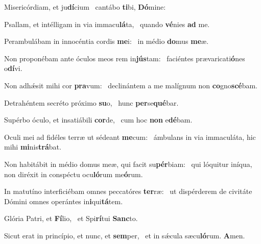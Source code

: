 \item Misericórdiam, et ju\textbf{dí}cium~\psstar{} cantábo \textbf{ti}bi, \textbf{Dó}mine:

\item Psallam, et intélligam in via immacu\textbf{lá}ta,~\psstar{} quando \textbf{vé}nies \textbf{ad} me.

\item Perambulábam in innocéntia cordis \textbf{me}i:~\psstar{} in médio \textbf{do}mus \textbf{me}æ.

\item Non proponébam ante óculos meos rem in\textbf{jús}tam:~\psstar{} faciéntes prævaricati\textbf{ó}nes o\textbf{dí}vi.

\item Non adhǽsit mihi cor \textbf{pra}vum:~\psstar{} declinántem a me malígnum non \textbf{co}gno\textbf{scé}bam.

\item Detrahéntem secréto próximo \textbf{su}o,~\psstar{} hunc \textbf{per}se\textbf{qué}bar.

\item Supérbo óculo, et insatiábili \textbf{cor}de,~\psstar{} cum hoc \textbf{non} e\textbf{dé}bam.

\item Oculi mei ad fidéles terræ ut sédeant \textbf{me}cum:~\psstar{} ámbulans in via immaculáta, hic mihi \textbf{mi}nis\textbf{trá}bat.

\item Non habitábit in médio domus meæ, qui facit su\textbf{pér}biam:~\psstar{} qui lóquitur iníqua, non diréxit in conspéctu ocu\textbf{ló}rum me\textbf{ó}rum.

\item In matutíno interficiébam omnes peccatóres \textbf{ter}ræ:~\psstar{} ut dispérderem de civitáte Dómini omnes operántes in\textbf{i}qui\textbf{tá}tem.

\item Glória Patri, et \textbf{Fí}lio,~\psstar{} et Spi\textbf{rí}tui \textbf{Sanc}to.

\item Sicut erat in princípio, et nunc, et \textbf{sem}per,~\psstar{} et in sǽcula sæcu\textbf{ló}rum. \textbf{A}men.
